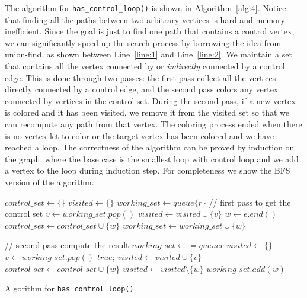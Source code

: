 \documentclass{article}
\begin{document}
The algorithm for \texttt{has\_control\_loop()} is shown in Algorithm~\ref{alg:4}. Notice that
finding all the paths between two arbitrary vertices is hard and memory inefficient. Since the
goal is just to find one path that contains a control vertex, we can significantly speed up
the search process by borrowing the idea from union-find, as shown between Line~\ref{line:1} and
Line~\ref{line:2}. We maintain a set that contains all the vertex connected by or \textit{indirectly}
connected by a control edge. This is done through two passes: the first pass collect all the
vertices directly connected by a control edge, and the second pass colors any vertex connected by
vertices in the control set. During the second pass, if a new vertex is colored and it has been
visited, we remove it from the visited set so that we can recompute any path from that vertex.
The coloring process ended when there is no vertex let to color or the target vertex has been
colored and we have reached a loop. The correctness of the algorithm can be proved by induction
on the graph, where the base case is the smallest loop with control loop and we add a vertex to
the loop during induction step. For completeness we show the BFS version of the algorithm.
\begin{algorithm}
    \label{alg:4}
    $control\_set \gets \{\}$\;
    $visited \gets \{\}$\;
    $working\_set \gets queue\{r\}$\;
    // first pass to get the control set\;
     {
        $v \gets working\_set.pop()$\;
         {
            \Continue\;
        } {
            $visited \gets visited \cup \{v\}$\;
        }
         {
            $w \gets e.end()$\;
             {
                $control\_set \gets control\_set \cup \{w\}$\;
            }
            $working\_set \gets working\_set \cup \{w\}$\;
        }
    }

    // second pass compute the result\;
    $working\_set \gets = queue{r}$\;
    $visited \gets \{\}$\;
     {
        $v \gets working\_set.pop()$\;
         {
            \Return $true$;
        }
         {
            \Continue\;
        } {
            $visited \gets visited \cup \{v\}$\;
        }
         {
            \label{line:1} {
                $control\_set \gets control\_set \cup \{w\}$\;
                 {
                    $visited \gets visited \setminus \{w\}$\;
                }
            \label{line:2}}
            $working\_set.add(w)$\;
        }
    }
    \;
 \caption{Algorithm for \texttt{has\_control\_loop()}}
\end{algorithm}
\end{document}
